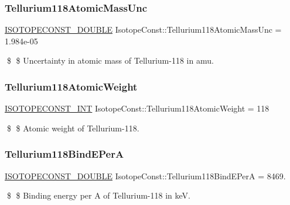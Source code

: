 \subsubsection{\texorpdfstring{Tellurium118\+Atomic\+Mass\+Unc}{Tellurium118AtomicMassUnc}}
{\footnotesize\ttfamily \mbox{\hyperlink{group___isotope_const-_macros_ga8f45a7272ce02c0b4c65c44636ed719a}{I\+S\+O\+T\+O\+P\+E\+C\+O\+N\+S\+T\+\_\+\+D\+O\+U\+B\+LE}} Isotope\+Const\+::\+Tellurium118\+Atomic\+Mass\+Unc = 1.\+984e-\/05}

\$ \$ Uncertainty in atomic mass of Tellurium-\/118 in amu. \mbox{\label{group___isotope_const-_tellurium-_te118_ga02768d17be6007c0d551263890e37a3d}} 
\subsubsection{\texorpdfstring{Tellurium118\+Atomic\+Weight}{Tellurium118AtomicWeight}}
{\footnotesize\ttfamily \mbox{\hyperlink{group___isotope_const-_macros_ga5f18360b3e99483a35c32d789e62621c}{I\+S\+O\+T\+O\+P\+E\+C\+O\+N\+S\+T\+\_\+\+I\+NT}} Isotope\+Const\+::\+Tellurium118\+Atomic\+Weight = 118}

\$ \$ Atomic weight of Tellurium-\/118. \mbox{\label{group___isotope_const-_tellurium-_te118_ga0c34e9c07bec078537fe322f9b87884f}} 
\subsubsection{\texorpdfstring{Tellurium118\+Bind\+E\+PerA}{Tellurium118BindEPerA}}
{\footnotesize\ttfamily \mbox{\hyperlink{group___isotope_const-_macros_ga8f45a7272ce02c0b4c65c44636ed719a}{I\+S\+O\+T\+O\+P\+E\+C\+O\+N\+S\+T\+\_\+\+D\+O\+U\+B\+LE}} Isotope\+Const\+::\+Tellurium118\+Bind\+E\+PerA = 8469.}

\$ \$ Binding energy per A of Tellurium-\/118 in keV. \mbox{\label{group___isotope_const-_tellurium-_te118_gae4b07e03a601e516844cfc096851891b}} 
